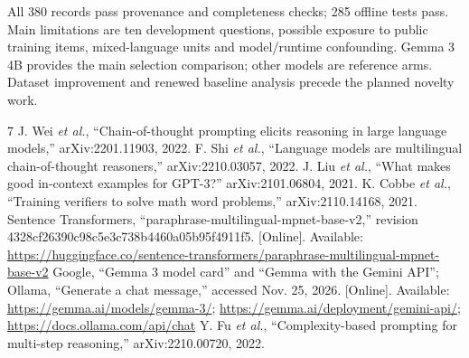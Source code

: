 \documentclass[conference]{IEEEtran}
\begin{document}
All 380 records pass provenance and completeness checks; 285 offline tests pass. Main limitations are ten development questions, possible exposure to public training items, mixed-language units and model/runtime confounding. Gemma 3 4B provides the main selection comparison; other models are reference arms. Dataset improvement and renewed baseline analysis precede the planned novelty work.

\begin{thebibliography}{7}
 J. Wei \emph{et al.}, ``Chain-of-thought prompting elicits reasoning in large language models,'' arXiv:2201.11903, 2022.
 F. Shi \emph{et al.}, ``Language models are multilingual chain-of-thought reasoners,'' arXiv:2210.03057, 2022.
 J. Liu \emph{et al.}, ``What makes good in-context examples for GPT-3?'' arXiv:2101.06804, 2021.
 K. Cobbe \emph{et al.}, ``Training verifiers to solve math word problems,'' arXiv:2110.14168, 2021.
 Sentence Transformers, ``paraphrase-multilingual-mpnet-base-v2,'' revision 4328cf26390c98c5e3c738b4460a05b95f4911f5. [Online]. Available: \url{https://huggingface.co/sentence-transformers/paraphrase-multilingual-mpnet-base-v2}
 Google, ``Gemma 3 model card'' and ``Gemma with the Gemini API''; Ollama, ``Generate a chat message,'' accessed Nov. 25, 2026. [Online]. Available: \url{https://gemma.ai/models/gemma-3/}; \url{https://gemma.ai/deployment/gemini-api/}; \url{https://docs.ollama.com/api/chat}
 Y. Fu \emph{et al.}, ``Complexity-based prompting for multi-step reasoning,'' arXiv:2210.00720, 2022.
\end{thebibliography}
\end{document}
